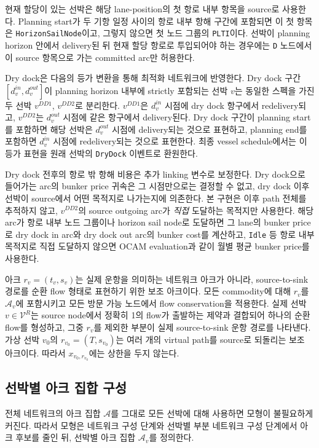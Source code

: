 \documentclass[11pt]{article}
\newcommand{\RealVessels}{\mathcal{V}^{R}}
\newcommand{\Arcs}{\mathcal{A}}
\begin{document}
현재 할당이 있는 선박은 해당 lane-position의 첫 항로 내부 항목을 source로 사용한다. Planning start가
두 기항 일정 사이의 항로 내부 항해 구간에 포함되면 이 첫 항목은
\texttt{HorizonSailNode}이고, 그렇지 않으면 첫 노드 그룹의 \texttt{PLTI}이다.
선박이 planning horizon 안에서 delivery된 뒤 현재 할당 항로로 투입되어야 하는
경우에는 \texttt{D} 노드에서 이 source 항목으로 가는 committed arc만 허용한다.

Dry dock은 다음의 등가 변환을 통해 최적화 네트워크에 반영한다. Dry dock 구간
$[d_v^{in},d_v^{out}]$이 planning horizon 내부에 strictly 포함되는 선박 $v$는
동일한 스펙을 가진 두 선박 $v^{DD1}$, $v^{DD2}$로 분리한다. $v^{DD1}$은
$d_v^{in}$ 시점에 dry dock 항구에서 redelivery되고, $v^{DD2}$는
$d_v^{out}$ 시점에 같은 항구에서 delivery된다. Dry dock 구간이 planning start를
포함하면 해당 선박은 $d_v^{out}$ 시점에 delivery되는 것으로 표현하고, planning
end를 포함하면 $d_v^{in}$ 시점에 redelivery되는 것으로 표현한다. 최종 vessel
schedule에서는 이 등가 표현을 원래 선박의 \texttt{DryDock} 이벤트로 환원한다.

Dry dock 전후의 항로 밖 항해 비용은 추가 linking 변수로 보정한다. Dry dock으로
들어가는 arc의 bunker price 귀속은 그 시점만으로는 결정할 수 없고, dry dock 이후
선박이 source에서 어떤 목적지로 나가는지에 의존한다. 본 구현은 이후 path 전체를
추적하지 않고, $v^{DD2}$의 source outgoing arc가 \emph{직접} 도달하는 목적지만
사용한다. 해당 arc가 항로 내부 노드 그룹이나 horizon sail node로 도달하면 그
lane의 bunker price로 dry dock in arc와 dry dock out arc의 bunker cost를 계산하고,
\texttt{Idle} 등 항로 내부 목적지로 직접 도달하지 않으면 OCAM evaluation과 같이
월별 평균 bunker price를 사용한다.

아크 $r_v=(t_v,s_v)$는 실제 운항을 의미하는 네트워크 아크가 아니라,
source-to-sink 경로를 순환 flow 형태로 표현하기 위한 보조 아크이다. 모든
commodity에 대해 $r_v$를 $\Arcs_v$에 포함시키고 모든 방문 가능 노드에서 flow
conservation을 적용한다. 실제 선박 $v\in\RealVessels$는 source node에서 정확히
1의 flow가 출발하는 제약과 결합되어 하나의 순환 flow를 형성하고, 그중 $r_v$를
제외한 부분이 실제 source-to-sink 운항 경로를 나타낸다. 가상 선박 $v_0$의
$r_{v_0}=(T,s_{v_0})$는 여러 개의 virtual path를 source로 되돌리는 보조 아크이다.
따라서 $x_{v_0,r_{v_0}}$에는 상한을 두지 않는다.

\subsection{선박별 아크 집합 구성}

전체 네트워크의 아크 집합 $\Arcs$를 그대로 모든 선박에 대해 사용하면 모형이
불필요하게 커진다. 따라서 모형은 네트워크 구성 단계와 선박별 부분 네트워크 구성
단계에서 아크 후보를 줄인 뒤, 선박별 아크 집합 $\Arcs_v$를 정의한다.
\end{document}
